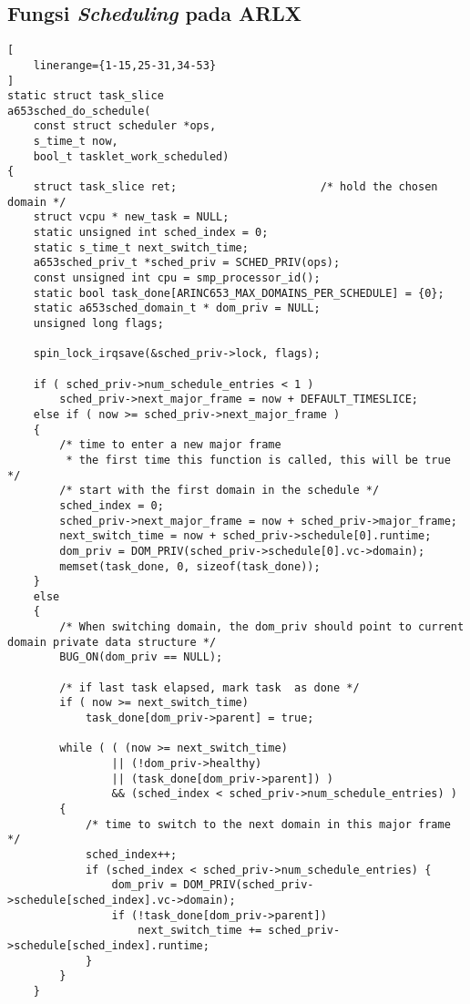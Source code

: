 
\begin{appendices}
\chapter{Fungsi \textit{Scheduling} pada ARLX}
\label{appendix:a653sched_do_schedule}

\begin{lstlisting}[
	linerange={1-15,25-31,34-53}
]
static struct task_slice
a653sched_do_schedule(
    const struct scheduler *ops,
    s_time_t now,
    bool_t tasklet_work_scheduled)
{
    struct task_slice ret;                      /* hold the chosen domain */
    struct vcpu * new_task = NULL;
    static unsigned int sched_index = 0;
    static s_time_t next_switch_time;
    a653sched_priv_t *sched_priv = SCHED_PRIV(ops);
    const unsigned int cpu = smp_processor_id();
    static bool task_done[ARINC653_MAX_DOMAINS_PER_SCHEDULE] = {0};
    static a653sched_domain_t * dom_priv = NULL;
    unsigned long flags;

    spin_lock_irqsave(&sched_priv->lock, flags);

    if ( sched_priv->num_schedule_entries < 1 )
        sched_priv->next_major_frame = now + DEFAULT_TIMESLICE;
    else if ( now >= sched_priv->next_major_frame )
    {
        /* time to enter a new major frame
         * the first time this function is called, this will be true */
        /* start with the first domain in the schedule */
        sched_index = 0;
        sched_priv->next_major_frame = now + sched_priv->major_frame;
        next_switch_time = now + sched_priv->schedule[0].runtime;
        dom_priv = DOM_PRIV(sched_priv->schedule[0].vc->domain);
        memset(task_done, 0, sizeof(task_done));
    }
    else
    {
        /* When switching domain, the dom_priv should point to current domain private data structure */
        BUG_ON(dom_priv == NULL);

        /* if last task elapsed, mark task  as done */
        if ( now >= next_switch_time) 
            task_done[dom_priv->parent] = true;

        while ( ( (now >= next_switch_time)
                || (!dom_priv->healthy)
                || (task_done[dom_priv->parent]) )
                && (sched_index < sched_priv->num_schedule_entries) )
        {
            /* time to switch to the next domain in this major frame */
            sched_index++;
            if (sched_index < sched_priv->num_schedule_entries) {
                dom_priv = DOM_PRIV(sched_priv->schedule[sched_index].vc->domain);
                if (!task_done[dom_priv->parent])
                    next_switch_time += sched_priv->schedule[sched_index].runtime;
            }
        }
    }


\end{lstlisting}
\end{appendices}
